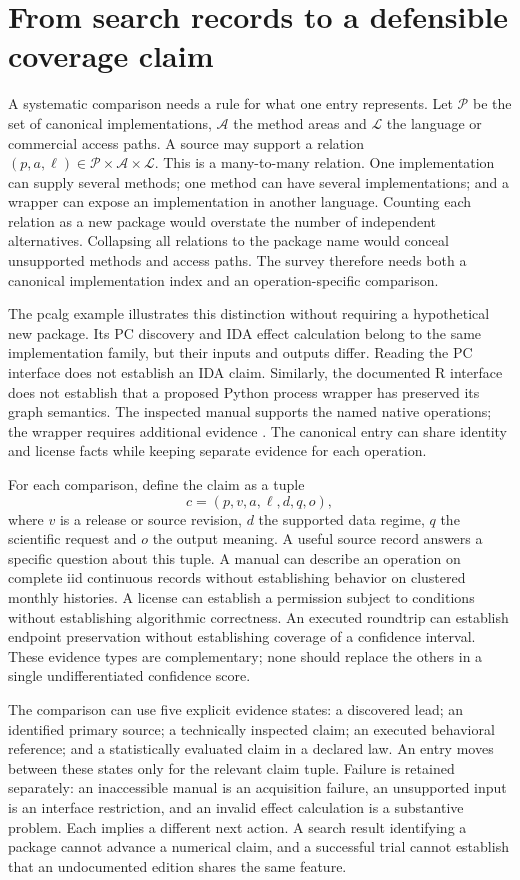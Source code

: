 \section{From search records to a defensible coverage claim}
\label{exec13:survey-coverage}

A systematic comparison needs a rule for what one entry represents. Let
$\mathcal P$ be the set of canonical implementations, $\mathcal A$ the method
areas and $\mathcal L$ the language or commercial access paths. A source may
support a relation $(p,a,\ell)\in\mathcal P\times\mathcal A\times\mathcal L$.
This is a many-to-many relation. One implementation can supply several methods;
one method can have several implementations; and a wrapper can expose an
implementation in another language. Counting each relation as a new package
would overstate the number of independent alternatives. Collapsing all
relations to the package name would conceal unsupported methods and access
paths. The survey therefore needs both a canonical implementation index and
an operation-specific comparison.

The pcalg example illustrates this distinction without requiring a hypothetical
new package. Its PC discovery and IDA effect calculation belong to the same
implementation family, but their inputs and outputs differ. Reading the PC
interface does not establish an IDA claim. Similarly, the documented R
interface does not establish that a proposed Python process wrapper has
preserved its graph semantics. The inspected manual supports the named native
operations; the wrapper requires additional evidence
\citep{exec13_pcalg}. The canonical entry can share identity and license facts
while keeping separate evidence for each operation.

For each comparison, define the claim as a tuple
\[
 c=(p,v,a,\ell,d,q,o),
\]
where $v$ is a release or source revision, $d$ the supported data regime,
$q$ the scientific request and $o$ the output meaning. A useful source record
answers a specific question about this tuple. A manual can describe an
operation on complete iid continuous records without establishing behavior
on clustered monthly histories. A license can establish a permission subject
to conditions without establishing algorithmic correctness. An executed
roundtrip can establish endpoint preservation without establishing coverage
of a confidence interval. These evidence types are complementary; none
should replace the others in a single undifferentiated confidence score.

The comparison can use five explicit evidence states: a discovered lead;
an identified primary source; a technically inspected claim; an executed
behavioral reference; and a statistically evaluated claim in a declared law.
An entry moves between these states only for the relevant claim tuple.
Failure is retained separately: an inaccessible manual is an acquisition
failure, an unsupported input is an interface restriction, and an invalid
effect calculation is a substantive problem. Each implies a different next
action. A search result identifying a package cannot advance a numerical
claim, and a successful trial cannot establish that an undocumented edition
shares the same feature.

